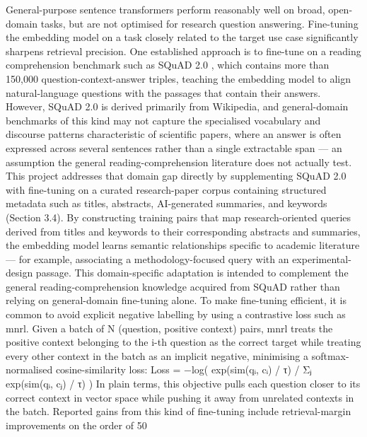 General-purpose sentence transformers perform reasonably well on broad, open-domain tasks, but are not optimised for research question answering. Fine-tuning the embedding model on a task closely related to the target use case significantly sharpens retrieval precision.
\newline \newline One established approach is to fine-tune on a reading comprehension benchmark such as SQuAD 2.0 \citep{rajpurkar2018know}, which contains more than 150,000 question-context-answer triples, teaching the embedding model to align natural-language questions with the passages that contain their answers. However, SQuAD 2.0 is derived primarily from Wikipedia, and general-domain benchmarks of this kind may not capture the specialised vocabulary and discourse patterns characteristic of scientific papers, where an answer is often expressed across several sentences rather than a single extractable span — an assumption the general reading-comprehension literature does not actually test.
\newline \newline This project addresses that domain gap directly by supplementing SQuAD 2.0 with fine-tuning on a curated research-paper corpus containing structured metadata such as titles, abstracts, AI-generated summaries, and keywords (Section 3.4). By constructing training pairs that map research-oriented queries derived from titles and keywords to their corresponding abstracts and summaries, the embedding model learns semantic relationships specific to academic literature — for example, associating a methodology-focused query with an experimental-design passage. This domain-specific adaptation is intended to complement the general reading-comprehension knowledge acquired from SQuAD rather than relying on general-domain fine-tuning alone.
\newline \newline To make fine-tuning efficient, it is common to avoid explicit negative labelling by using a contrastive loss such as \gls{mnrl}. Given a batch of N (question, positive context) pairs, \gls{mnrl} treats the positive context belonging to the i-th question as the correct target while treating every other context in the batch as an implicit negative, minimising a softmax-normalised cosine-similarity loss:
\newline \newline Loss = −log( exp(sim(qᵢ, cᵢ) / τ) / Σⱼ exp(sim(qᵢ, cⱼ) / τ) )
\newline \newline In plain terms, this objective pulls each question closer to its correct context in vector space while pushing it away from unrelated contexts in the batch. Reported gains from this kind of fine-tuning include retrieval-margin improvements on the order of 50%

